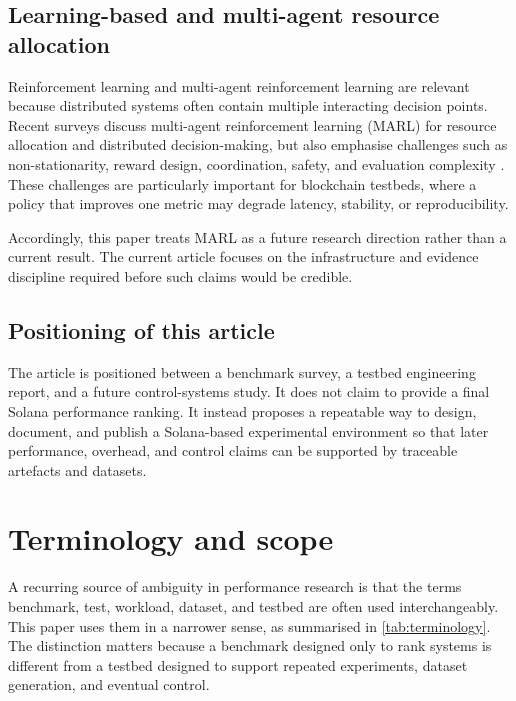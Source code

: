 \documentclass[11pt,a4paper]{article}
\begin{document}
\subsection{Learning-based and multi-agent resource allocation}
\label{subsec:related-marl}

Reinforcement learning and multi-agent reinforcement learning are relevant because distributed systems often contain multiple interacting decision points. Recent surveys discuss multi-agent reinforcement learning (MARL) for resource allocation and distributed decision-making, but also emphasise challenges such as non-stationarity, reward design, coordination, safety, and evaluation complexity \cite{hady2025marl,doostmohammadian2025dra}. These challenges are particularly important for blockchain testbeds, where a policy that improves one metric may degrade latency, stability, or reproducibility.

Accordingly, this paper treats MARL as a future research direction rather than a current result. The current article focuses on the infrastructure and evidence discipline required before such claims would be credible.

\subsection{Positioning of this article}
\label{subsec:related-positioning}

The article is positioned between a benchmark survey, a testbed engineering report, and a future control-systems study. It does not claim to provide a final Solana performance ranking. It instead proposes a repeatable way to design, document, and publish a Solana-based experimental environment so that later performance, overhead, and control claims can be supported by traceable artefacts and datasets.

\section{Terminology and scope}
\label{sec:terminology}

A recurring source of ambiguity in performance research is that the terms benchmark, test, workload, dataset, and testbed are often used interchangeably. This paper uses them in a narrower sense, as summarised in \cref{tab:terminology}. The distinction matters because a benchmark designed only to rank systems is different from a testbed designed to support repeated experiments, dataset generation, and eventual control.
\end{document}
